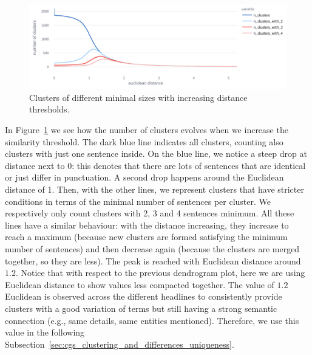 \begin{figure}[!htbp]
    \centering
    \includegraphics[width=\linewidth]{figures/clusters_count_by_threshold_bigger_2.png}
    \caption{
    Clusters of different minimal sizes with increasing distance thresholds.
    }
    \label{fig:clusers_count_by_threshold}
\end{figure}
In Figure~\ref{fig:clusers_count_by_threshold} we see how the number of clusters evolves when we increase the similarity threshold. 
The dark blue line indicates all clusters, counting also clusters with just one sentence inside.
On the blue line, we notice a steep drop at distance next to $0$: this denotes that there are lots of sentences that are identical or just differ in punctuation.
A second drop happens around the Euclidean distance of 1.
Then, with the other lines, we represent clusters that have stricter conditions in terms of the minimal number of sentences per cluster. We respectively only count clusters with 2, 3 and 4 sentences minimum.
All these lines have a similar behaviour: with the distance increasing, they increase to reach a maximum (because new clusters are formed satisfying the minimum number of sentences) and then decrease again (because the clusters are merged together, so they are less). 
The peak is reached with Euclidean distance around $1.2$.
Notice that with respect to the previous dendrogram plot, here we are using Euclidean distance to show values less compacted together.
The value of $1.2$ Euclidean is observed across the different headlines to consistently provide clusters with a good variation of terms but still having a strong semantic connection (e.g., same details, same entities mentioned).
Therefore, we use this value in the following Subsection~\ref{sec:cgs_clustering_and_differences_uniqueness}.

